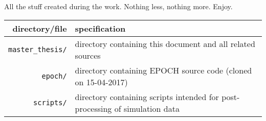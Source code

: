 All the stuff created during the work. Nothing less, nothing more. Enjoy.\\

\centering
{\renewcommand{\arraystretch}{1.5}
	\begin{tabular}{rl}
		\hline \textbf{directory/file} & \textbf{specification} \\
		\hline
		\hline
		\texttt{master\_thesis/} & \parbox[t]{8cm}{directory containing this document and all related sources} \\
		\texttt{epoch/} & \parbox[t]{8cm}{directory containing EPOCH source code (cloned on 15-04-2017)} \\
		\texttt{scripts/} & \parbox[t]{8cm}{directory containing scripts intended for post-processing of simulation data} \\
		\hline
	\end{tabular}
}